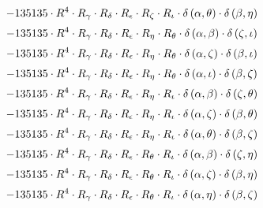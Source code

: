 \begin{subequations}
\begin{gather}
 \\[0.2em] \notag 		 - 135135 \cdot R^{4} \cdot R_{\gamma{}} \cdot R_{\delta{}} \cdot R_{\epsilon{}} \cdot R_{\zeta{}} \cdot R_{\iota{}} \cdot \delta{}\left(\alpha{}, \theta{}\right) \cdot \delta{}\left(\beta{}, \eta{}\right) 
 \\[0.2em] \notag 		 - 135135 \cdot R^{4} \cdot R_{\gamma{}} \cdot R_{\delta{}} \cdot R_{\epsilon{}} \cdot R_{\eta{}} \cdot R_{\theta{}} \cdot \delta{}\left(\alpha{}, \beta{}\right) \cdot \delta{}\left(\zeta{}, \iota{}\right) 
 \\[0.2em] \notag 		 - 135135 \cdot R^{4} \cdot R_{\gamma{}} \cdot R_{\delta{}} \cdot R_{\epsilon{}} \cdot R_{\eta{}} \cdot R_{\theta{}} \cdot \delta{}\left(\alpha{}, \zeta{}\right) \cdot \delta{}\left(\beta{}, \iota{}\right) 
 \\[0.2em] \notag 		 - 135135 \cdot R^{4} \cdot R_{\gamma{}} \cdot R_{\delta{}} \cdot R_{\epsilon{}} \cdot R_{\eta{}} \cdot R_{\theta{}} \cdot \delta{}\left(\alpha{}, \iota{}\right) \cdot \delta{}\left(\beta{}, \zeta{}\right) 
 \\[0.2em] \notag 		 - 135135 \cdot R^{4} \cdot R_{\gamma{}} \cdot R_{\delta{}} \cdot R_{\epsilon{}} \cdot R_{\eta{}} \cdot R_{\iota{}} \cdot \delta{}\left(\alpha{}, \beta{}\right) \cdot \delta{}\left(\zeta{}, \theta{}\right) 
 \\[0.2em] \notag 		 - 135135 \cdot R^{4} \cdot R_{\gamma{}} \cdot R_{\delta{}} \cdot R_{\epsilon{}} \cdot R_{\eta{}} \cdot R_{\iota{}} \cdot \delta{}\left(\alpha{}, \zeta{}\right) \cdot \delta{}\left(\beta{}, \theta{}\right) 
 \\[0.2em] \notag 		 - 135135 \cdot R^{4} \cdot R_{\gamma{}} \cdot R_{\delta{}} \cdot R_{\epsilon{}} \cdot R_{\eta{}} \cdot R_{\iota{}} \cdot \delta{}\left(\alpha{}, \theta{}\right) \cdot \delta{}\left(\beta{}, \zeta{}\right) 
 \\[0.2em] \notag 		 - 135135 \cdot R^{4} \cdot R_{\gamma{}} \cdot R_{\delta{}} \cdot R_{\epsilon{}} \cdot R_{\theta{}} \cdot R_{\iota{}} \cdot \delta{}\left(\alpha{}, \beta{}\right) \cdot \delta{}\left(\zeta{}, \eta{}\right) 
 \\[0.2em] \notag 		 - 135135 \cdot R^{4} \cdot R_{\gamma{}} \cdot R_{\delta{}} \cdot R_{\epsilon{}} \cdot R_{\theta{}} \cdot R_{\iota{}} \cdot \delta{}\left(\alpha{}, \zeta{}\right) \cdot \delta{}\left(\beta{}, \eta{}\right) 
 \\[0.2em] \notag 		 - 135135 \cdot R^{4} \cdot R_{\gamma{}} \cdot R_{\delta{}} \cdot R_{\epsilon{}} \cdot R_{\theta{}} \cdot R_{\iota{}} \cdot \delta{}\left(\alpha{}, \eta{}\right) \cdot \delta{}\left(\beta{}, \zeta{}\right) 

\end{gather}
\end{subequations}

